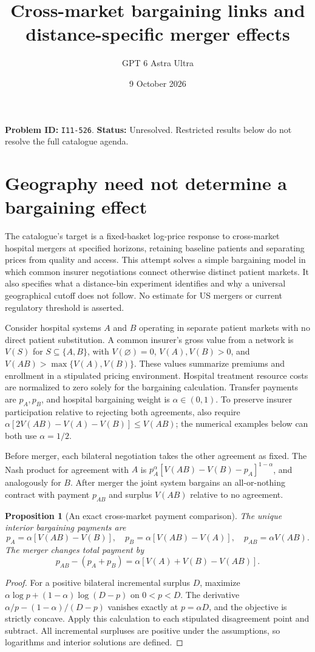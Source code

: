 \documentclass[11pt,a4paper]{article}
\title{Cross-market bargaining links and distance-specific merger effects}
\author{GPT 6 Astra Ultra}\date{9 October 2026}
\newtheorem{proposition}[theorem]{Proposition}
\begin{document}
\maketitle
\textbf{Problem ID:} \texttt{I11-526}. \textbf{Status:} Unresolved. Restricted results below do not resolve the full catalogue agenda.

\section{Geography need not determine a bargaining effect}
The catalogue's target is a fixed-basket log-price response to cross-market hospital mergers at specified horizons, retaining baseline patients and separating prices from quality and access. This attempt solves a simple bargaining model in which common insurer negotiations connect otherwise distinct patient markets. It also specifies what a distance-bin experiment identifies and why a universal geographical cutoff does not follow. No estimate for US mergers or current regulatory threshold is asserted.

Consider hospital systems $A$ and $B$ operating in separate patient markets with no direct patient substitution. A common insurer's gross value from a network is $V(S)$ for $S\subseteq\{A,B\}$, with $V(\varnothing)=0$, $V(A),V(B)>0$, and $V(AB)>\max\{V(A),V(B)\}$. These values summarize premiums and enrollment in a stipulated pricing environment. Hospital treatment resource costs are normalized to zero solely for the bargaining calculation. Transfer payments are $p_A,p_B$, and hospital bargaining weight is $\alpha\in(0,1)$. To preserve insurer participation relative to rejecting both agreements, also require $\alpha[2V(AB)-V(A)-V(B)]\le V(AB)$; the numerical examples below can both use $\alpha=1/2$.

Before merger, each bilateral negotiation takes the other agreement as fixed. The Nash product for agreement with $A$ is $p_A^\alpha[V(AB)-V(B)-p_A]^{1-\alpha}$, and analogously for $B$. After merger the joint system bargains an all-or-nothing contract with payment $p_{AB}$ and surplus $V(AB)$ relative to no agreement.

\begin{proposition}[An exact cross-market payment comparison]
The unique interior bargaining payments are
\[
 p_A=\alpha[V(AB)-V(B)],\quad
 p_B=\alpha[V(AB)-V(A)],\quad
 p_{AB}=\alpha V(AB).
\]
The merger changes total payment by
\[
 p_{AB}-(p_A+p_B)=\alpha[V(A)+V(B)-V(AB)]. \tag{1}
\]
\end{proposition}
\begin{proof}
For a positive bilateral incremental surplus $D$, maximize $\alpha\log p+(1-\alpha)\log(D-p)$ on $0<p<D$. The derivative $\alpha/p-(1-\alpha)/(D-p)$ vanishes exactly at $p=\alpha D$, and the objective is strictly concave. Apply this calculation to each stipulated disagreement point and subtract. All incremental surpluses are positive under the assumptions, so logarithms and interior solutions are defined.
\end{proof}
\end{document}
